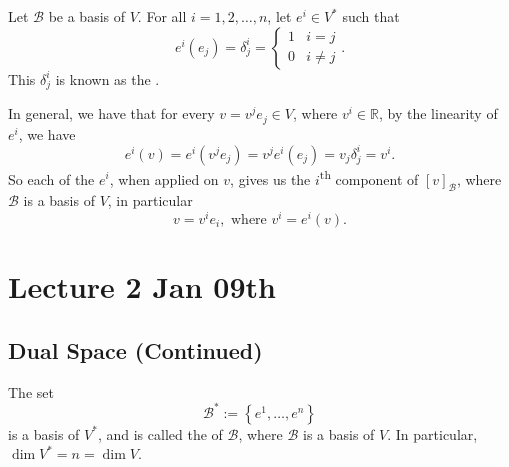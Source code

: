 \documentclass[notoc,notitlepage]{tufte-book}
\begin{document}
Let $\mathcal{B}$ be a basis of $V$. For all $i = 1, 2, \ldots, n$, let $e^i \in V^*$ such that
\begin{equation*}
  e^i(e_j) = \delta^i_j = \begin{cases}
    1 & i = j \\
    0 & i \neq j
  \end{cases}.
\end{equation*}
This $\delta^i_j$ is known as the .

In general, we have that for every $v = v^j e_j \in V$, where $v^i \in \mathbb{R}$,
by the linearity of $e^i$, we have
\begin{equation*}
  e^i(v) = e^i(v^j e_j) = v^j e^i(e_j) = v_j \delta^i_j = v^i.
\end{equation*}
So each of the $e^i$, when applied on $v$,
gives us the $i$\textsuperscript{th} component of $[v]_{\mathcal{B}}$,
where $\mathcal{B}$ is a basis of $V$, in particular
\begin{equation}\label{eq:v_wrt_basis}
  v = v^i e_i, \text{ where } v^i = e^i(v).
\end{equation}



\chapter{Lecture 2 Jan 09th}%
\label{chp:lecture_2_jan_09th}

\section{Dual Space (Continued)}%
\label{sec:dual_space_continued}

\begin{propo}\label{propo:dual_basis}
  The set
  \begin{equation*}
    \mathcal{B}^* := \left\{ e^1, \ldots, e^n \right\}
  \end{equation*}
  is a basis of $V^*$, and is called the  of $\mathcal{B}$,
  where $\mathcal{B}$ is a basis of $V$.
  In particular, $\dim V^* = n = \dim V$.
\end{propo}
\end{document}
